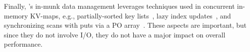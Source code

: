 Finally, \sys's in-munk data management leverages techniques used in concurrent in-memory KV-maps, e.g., partially-sorted 
key lists~\cite{Wu:2019:WFO:3302424.3303955,kiwi}, lazy index updates~\cite{kiwi,tdls}, 
and synchronizing scans with puts via a PO array~\cite{kiwi}. These aspects are important, but since they do not involve I/O, they do not have a major impact on overall performance.

